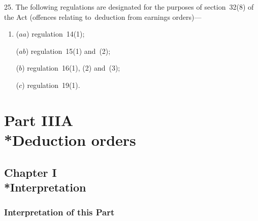 \documentclass[12pt,a4paper]{article}
\begin{document}
25.  The following regulations are designated for the purposes of section~32(8) of the Act (offences relating to~deduction from earnings orders)—
\begin{enumerate}\item[]
($aa$) regulation~14(1);

($ab$)  %
regulation~15(1) and~(2);

($b$) regulation~16(1), (2) and~(3);

($c$) regulation~19(1).
\end{enumerate}



\section[Part IIIA --- Deduction orders]{Part IIIA\\*Deduction orders}


\subsection[Chapter I --- Interpretation]{Chapter I\\*Interpretation}

\renewcommand\parthead{--- Part IIIA Chapter I}

\subsubsection[25A. Interpretation of this Part]{Interpretation of this Part}
\end{document}
